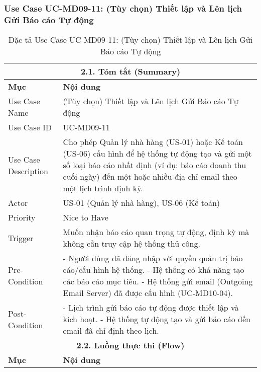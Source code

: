 \subsubsection{Use Case UC-MD09-11: (Tùy chọn) Thiết lập và Lên lịch Gửi Báo cáo Tự động}
\begin{longtable}{|m{4cm}|p{11cm}|}
\caption{Đặc tả Use Case UC-MD09-11: (Tùy chọn) Thiết lập và Lên lịch Gửi Báo cáo Tự động} \label{tab:uc_md09_11_corrected} \\
\hline
\multicolumn{2}{|c|}{\textbf{2.1. Tóm tắt (Summary)}} \\
\hline
\textbf{Mục} & \textbf{Nội dung} \\
\hline
\endhead %
\midrule
\endfoot %
\bottomrule
\endlastfoot %
Use Case Name & (Tùy chọn) Thiết lập và Lên lịch Gửi Báo cáo Tự động \\
\hline
Use Case ID & UC-MD09-11 \\
\hline
Use Case Description & Cho phép Quản lý nhà hàng (US-01) hoặc Kế toán (US-06) cấu hình để hệ thống tự động tạo và gửi một số loại báo cáo nhất định (ví dụ: báo cáo doanh thu cuối ngày) đến một hoặc nhiều địa chỉ email theo một lịch trình định kỳ. \\
\hline
Actor & US-01 (Quản lý nhà hàng), US-06 (Kế toán) \\
\hline
Priority & Nice to Have \\
\hline
Trigger & Muốn nhận báo cáo quan trọng tự động, định kỳ mà không cần truy cập hệ thống thủ công. \\
\hline
Pre-Condition & - Người dùng đã đăng nhập với quyền quản trị báo cáo/cấu hình hệ thống. \newline - Hệ thống có khả năng tạo các báo cáo mục tiêu. \newline - Hệ thống gửi email (Outgoing Email Server) đã được cấu hình (UC-MD10-04). \\
\hline
Post-Condition & - Lịch trình gửi báo cáo tự động được thiết lập và kích hoạt. \newline - Hệ thống tự động tạo và gửi báo cáo đến email đã chỉ định theo lịch. \\
\hline
\multicolumn{2}{|c|}{\textbf{2.2. Luồng thực thi (Flow)}} \\
\hline
\textbf{Mục} & \textbf{Nội dung} \\
\hline

\end{longtable}
